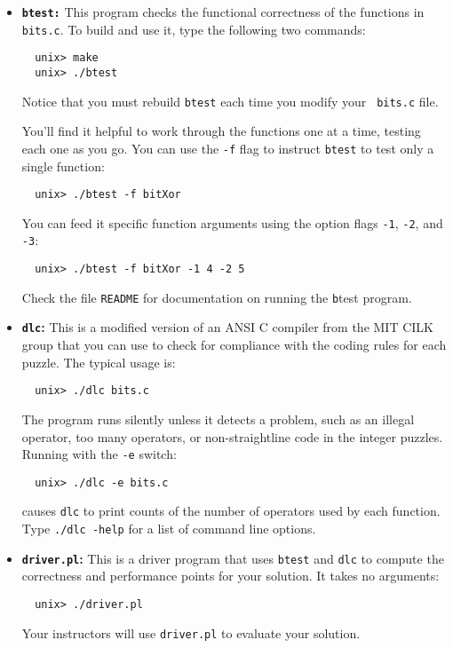 \documentclass[11pt]{article}
\begin{document}
\begin{itemize}
\item {\bf \texttt{btest:}} This program checks the functional correctness of
  the functions in {\tt bits.c}. To build and use it, type the
  following two commands:
\begin{verbatim}
  unix> make
  unix> ./btest
\end{verbatim}
Notice that you must rebuild \texttt{btest} each time you modify your {\tt
  bits.c} file. 

You'll find it helpful to work through the functions one at a time,
testing each one as you go.  You can use the {\tt -f} flag to instruct
\texttt{btest} to test only a single function:
\begin{verbatim}
  unix> ./btest -f bitXor
\end{verbatim}
You can feed it specific function arguments
using the option flags {\tt -1}, {\tt -2}, and {\tt -3}:
\begin{verbatim}
  unix> ./btest -f bitXor -1 4 -2 5
\end{verbatim}
Check the file {\tt README} for documentation on running the {\texttt
  btest} program.


\item {\bf \texttt{dlc}:} This is a modified version of an ANSI C compiler from
the MIT CILK group that you can use to check for compliance with the
coding rules for each puzzle. The typical usage is:
\begin{verbatim}
  unix> ./dlc bits.c
\end{verbatim}
The program runs silently unless it detects a problem, such as an
illegal operator, too many operators, or non-straightline code in the
integer puzzles.  Running with the \texttt{-e} switch:
\begin{verbatim}
  unix> ./dlc -e bits.c  
\end{verbatim}
causes \texttt{dlc} to print counts of the number of operators used by
each function. Type {\tt ./dlc -help} for a list of command line options. 

\item {\bf \texttt{driver.pl}:} This is a driver program that uses \texttt{btest}
and \texttt{dlc} to compute the correctness and performance points for
your solution. It takes no arguments:
\begin{verbatim}
  unix> ./driver.pl
\end{verbatim}
Your instructors will use \texttt{driver.pl} to evaluate your
solution.

\end{itemize}
\end{document}
